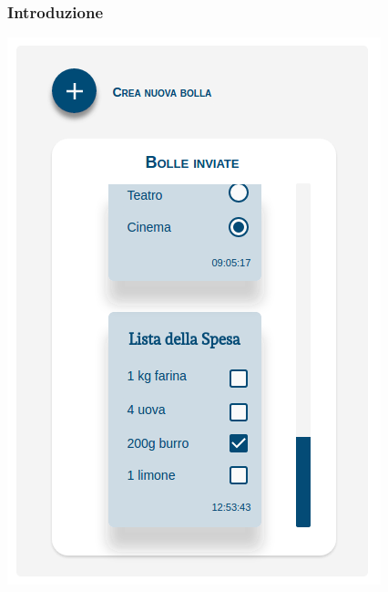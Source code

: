 \begin{frame}
  \frametitle{Introduzione}
\begin{center}
	\includegraphics[scale=0.35]{img/mockup_1.png}
\end{center}
 
\end{frame}


